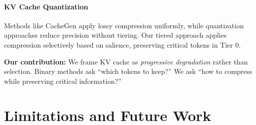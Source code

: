 \documentclass[11pt]{article}
\begin{document}
\paragraph{KV Cache Quantization} Methods like CacheGen \cite{cachegen} apply lossy compression uniformly, while quantization approaches \cite{kivi} reduce precision without tiering. Our tiered approach applies compression selectively based on salience, preserving critical tokens in Tier 0.

\textbf{Our contribution:} We frame KV cache as \textit{progressive degradation} rather than selection. Binary methods ask ``which tokens to keep?'' We ask ``how to compress while preserving critical information?''

\section{Limitations and Future Work}
\end{document}
